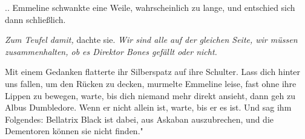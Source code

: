 .. Emmeline schwankte eine Weile, wahrscheinlich zu lange, und entschied sich
dann schließlich.

\emph{Zum Teufel damit,} dachte sie. \emph{Wir sind alle auf der gleichen Seite,
wir müssen zusammenhalten, ob es Direktor Bones gefällt oder nicht.}

Mit einem Gedanken flatterte ihr Silberspatz auf ihre Schulter. \glqq Lass dich
hinter uns fallen, um den Rücken zu decken\grqq{}, murmelte Emmeline leise, fast
ohne ihre Lippen zu bewegen, \glqq warte, bis dich niemand mehr direkt ansieht,
dann geh zu Albus Dumbledore. Wenn er nicht allein ist, warte, bis er es ist.
Und sag ihm Folgendes: Bellatrix Black ist dabei, aus Askaban auszubrechen, und
die Dementoren können sie nicht finden."

